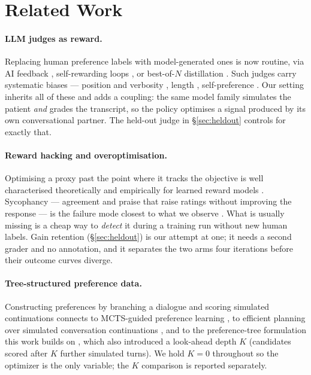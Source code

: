 \section{Related Work}
\label{sec:related}

\paragraph{LLM judges as reward.} Replacing human preference labels with model-generated ones
\citep{christiano2017deeprl,ouyang2022instructgpt} is now routine, via AI feedback
\citep{guo2024oaif}, self-rewarding loops \citep{yuan2024selfrewarding}, or best-of-$N$
distillation \citep{pace2024westofn}. Such judges carry systematic biases --- position and
verbosity \citep{zheng2023judging}, length \citep{dubois2024lengthcontrolled}, self-preference
\citep{panickssery2024selfpreference}. Our setting inherits all of these and adds a coupling:
the same model family simulates the patient \emph{and} grades the transcript, so the policy
optimises a signal produced by its own conversational partner. The held-out judge in
\S\ref{sec:heldout} controls for exactly that.

\paragraph{Reward hacking and overoptimisation.} Optimising a proxy past the point where it
tracks the objective is well characterised theoretically \citep{skalse2022defining} and
empirically for learned reward models \citep{gao2023scaling}. Sycophancy --- agreement and
praise that raise ratings without improving the response --- is the failure mode closest to
what we observe \citep{sharma2024sycophancy,perez2023discovering}. What is usually missing is
a cheap way to \emph{detect} it during a training run without new human labels. Gain
retention (\S\ref{sec:heldout}) is our attempt at one; it needs a second grader and no
annotation, and it separates the two arms four iterations before their outcome curves
diverge.

\paragraph{Tree-structured preference data.} Constructing preferences by branching a dialogue
and scoring simulated continuations connects to MCTS-guided preference learning
\citep{xie2024mctsdpo,yu2023promptmcts,yuan2024eurus}, to efficient planning over simulated
conversation continuations \citep{chen2025broaden}, and to the preference-tree formulation
this work builds on \citep{baruch2025pto}, which also introduced a look-ahead depth $K$
(candidates scored after $K$ further simulated turns). We hold $K=0$ throughout so the
optimizer is the only variable; the $K$ comparison is reported separately.

